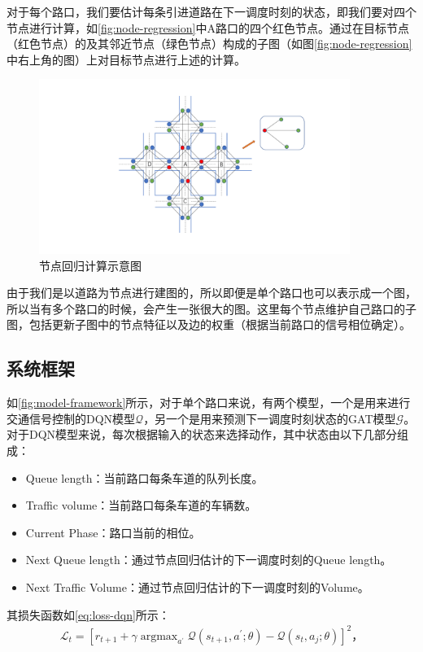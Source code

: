 对于每个路口，我们要估计每条引进道路在下一调度时刻的状态，即我们要对四个节点进行计算，如\autoref{fig:node-regression}中A路口的四个红色节点。通过在目标节点（红色节点）的及其邻近节点（绿色节点）构成的子图（如图\autoref{fig:node-regression}中右上角的图）上对目标节点进行上述的计算。
\begin{figure}[htb]
  \includegraphics[width=0.9\textwidth]{fig/node-regression.pdf}
  \caption{节点回归计算示意图}
  \label{fig:node-regression}
\end{figure}
由于我们是以道路为节点进行建图的，所以即便是单个路口也可以表示成一个图，所以当有多个路口的时候，会产生一张很大的图。这里每个节点维护自己路口的子图，包括更新子图中的节点特征以及边的权重（根据当前路口的信号相位确定）。

\subsection{系统框架}
如\autoref{fig:model-framework}所示，对于单个路口来说，有两个模型，一个是用来进行交通信号控制的DQN模型$\mathcal{Q}$，另一个是用来预测下一调度时刻状态的GAT模型$\mathcal{G}$。
对于DQN模型来说，每次根据输入的状态来选择动作，其中状态由以下几部分组成：
\begin{itemize}
  \item Queue length：当前路口每条车道的队列长度。
  \item Traffic volume：当前路口每条车道的车辆数。
  \item Current Phase：路口当前的相位。
  \item Next Queue length：通过节点回归估计的下一调度时刻的Queue length。
  \item Next Traffic Volume：通过节点回归估计的下一调度时刻的Volume。
\end{itemize}
其损失函数如\autoref{eq:loss-dqn}所示：
\begin{align}
  \label{eq:loss-dqn}
  \mathcal{L}_t=[ r_{t+1}+\gamma \mathop{\arg\max}_{a^{\prime}} \mathcal{Q}(s_{t+1},a^{'};\theta)-\mathcal{Q}(s_t,a_j;\theta)]^2，
\end{align}


